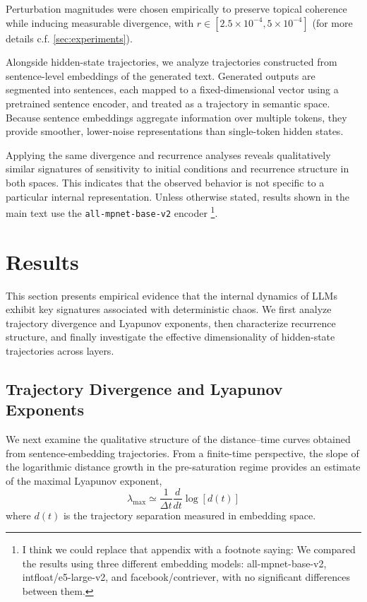 \documentclass[aip%
 aip,
 amsmath,amssymb,
 reprint,%
]{revtex4-1}
\begin{document}
Perturbation magnitudes were chosen empirically to preserve topical coherence while inducing measurable divergence, with $r\in[2.5\times10^{-4},5\times10^{-4}]$ (for more details c.f. \ref{sec:experiments}).

Alongside hidden-state trajectories, we analyze trajectories constructed from sentence-level embeddings of the generated text. Generated outputs are segmented into sentences, each mapped to a fixed-dimensional vector using a pretrained sentence encoder, and treated as a trajectory in semantic space. Because sentence embeddings aggregate information over multiple tokens, they provide smoother, lower-noise representations than single-token hidden states.

Applying the same divergence and recurrence analyses reveals qualitatively similar signatures of sensitivity to initial conditions and recurrence structure in both spaces. This indicates that the observed behavior is not specific to a particular internal representation. Unless otherwise stated, results shown in the main text use the \texttt{all-mpnet-base-v2} encoder
\footnote{I think we could replace that appendix with a footnote saying: We compared the results using three different embedding models: all-mpnet-base-v2, intfloat/e5-large-v2, and facebook/contriever, with no significant differences between them.}.

\section{Results}
\label{sec:results}
This section presents empirical evidence that the internal dynamics of LLMs exhibit key signatures associated with deterministic chaos. We first analyze trajectory divergence and Lyapunov exponents, then characterize recurrence structure, and finally investigate the effective dimensionality of hidden-state trajectories across layers.

\subsection{Trajectory Divergence and Lyapunov Exponents}
\label{res:lyapunov}

We next examine the qualitative structure of the distance–time curves obtained from sentence-embedding trajectories. From a finite-time perspective, the slope of the logarithmic distance growth in the pre-saturation regime provides an estimate of the maximal Lyapunov exponent,
\begin{equation}
    \lambda_\mathrm{max}\simeq\frac{1}{\Delta t}\frac{d}{dt}\log[d(t)]
\end{equation}
where $d(t)$ is the trajectory separation measured in embedding space. 
\end{document}

